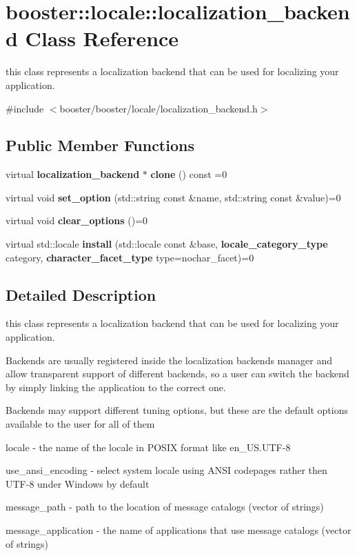 \section{booster\-:\-:locale\-:\-:localization\-\_\-backend Class Reference}
\label{classbooster_1_1locale_1_1localization__backend}


this class represents a localization backend that can be used for localizing your application.  




{\ttfamily \#include $<$booster/booster/locale/localization\-\_\-backend.\-h$>$}

\subsection*{Public Member Functions}
\begin{DoxyCompactItemize}
\item 
virtual {\bf localization\-\_\-backend} $\ast$ {\bf clone} () const =0
\item 
virtual void {\bf set\-\_\-option} (std\-::string const \&name, std\-::string const \&value)=0
\item 
virtual void {\bf clear\-\_\-options} ()=0
\item 
virtual std\-::locale {\bf install} (std\-::locale const \&base, {\bf locale\-\_\-category\-\_\-type} category, {\bf character\-\_\-facet\-\_\-type} type=nochar\-\_\-facet)=0
\end{DoxyCompactItemize}


\subsection{Detailed Description}
this class represents a localization backend that can be used for localizing your application. 

Backends are usually registered inside the localization backends manager and allow transparent support of different backends, so a user can switch the backend by simply linking the application to the correct one.

Backends may support different tuning options, but these are the default options available to the user for all of them


\begin{DoxyEnumerate}
\item {\ttfamily locale} -\/ the name of the locale in P\-O\-S\-I\-X format like en\-\_\-\-U\-S.\-U\-T\-F-\/8
\item {\ttfamily use\-\_\-ansi\-\_\-encoding} -\/ select system locale using A\-N\-S\-I codepages rather then U\-T\-F-\/8 under Windows by default
\item {\ttfamily message\-\_\-path} -\/ path to the location of message catalogs (vector of strings)
\item {\ttfamily message\-\_\-application} -\/ the name of applications that use message catalogs (vector of strings)
\end{DoxyEnumerate}

